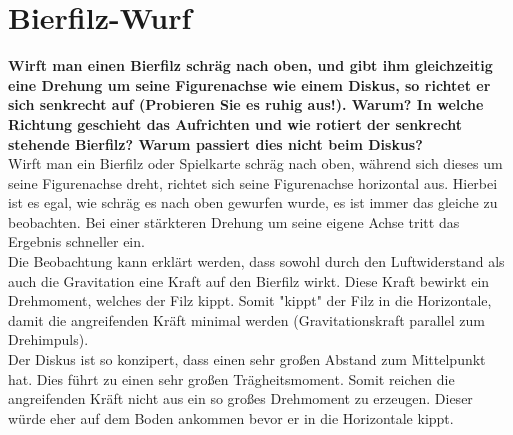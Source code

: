 \section{Bierfilz-Wurf}
\textbf{Wirft man einen Bierfilz schräg nach oben, und gibt ihm gleichzeitig eine Drehung um seine Figurenachse wie einem Diskus, so richtet er sich senkrecht auf (Probieren Sie es ruhig aus!). Warum? In welche Richtung geschieht das Aufrichten und wie rotiert der senkrecht stehende Bierfilz? Warum passiert dies nicht beim Diskus?}\\
Wirft man ein Bierfilz oder Spielkarte schräg nach oben, während sich dieses um seine Figurenachse dreht, richtet sich seine Figurenachse horizontal aus.
Hierbei ist es egal, wie schräg es nach oben gewurfen wurde, es ist immer das gleiche zu beobachten.
Bei einer stärkteren Drehung um seine eigene Achse tritt das Ergebnis schneller ein.\\
Die Beobachtung kann erklärt werden, dass sowohl durch den Luftwiderstand als auch die Gravitation eine Kraft auf den Bierfilz wirkt.
Diese Kraft bewirkt ein Drehmoment, welches der Filz kippt.
Somit "kippt" der Filz in die Horizontale, damit die angreifenden Kräft minimal werden (Gravitationskraft parallel zum Drehimpuls).\\
Der Diskus ist so konzipert, dass einen sehr großen Abstand zum Mittelpunkt hat.
Dies führt zu einen sehr großen Trägheitsmoment.
Somit reichen die angreifenden Kräft nicht aus ein so großes Drehmoment zu erzeugen.
Dieser würde eher auf dem Boden ankommen bevor er in die Horizontale kippt.

